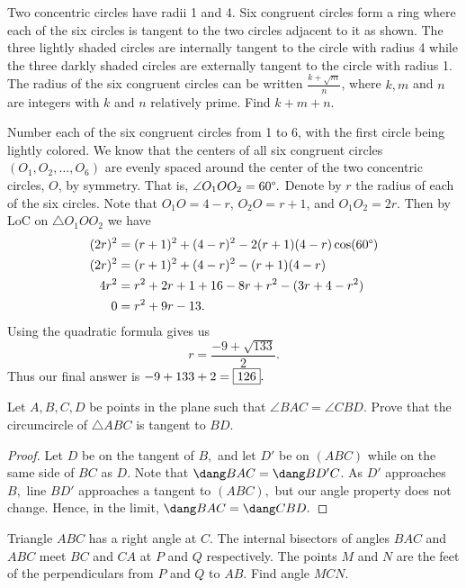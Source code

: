 \documentclass[letterpaper,oneside]{scrartcl}
\begin{document}
\begin{problem*}
  Two concentric circles have radii 1 and 4. Six congruent circles form a ring where each of the six circles is tangent to the two circles adjacent to it as shown. The three lightly shaded circles are internally tangent to the circle with radius 4 while the three darkly shaded circles are externally tangent to the circle with radius 1. The radius of the six congruent circles can be written \(\frac{k+\sqrt{m}}{n}\), where \(k,m\) and \(n\) are integers with \(k\) and \(n\) relatively prime. Find \(k+m+n\).
\end{problem*}
\begin{soln}
  Number each of the six congruent circles from 1 to 6, with the first circle being lightly colored. We know that the centers of all six congruent circles \((O_1,O_2,\dots,O_6)\) are evenly spaced around the center of the two concentric circles, \(O\), by symmetry. That is, \(\angle O_1OO_2 = 60\degree.\) Denote by \(r\) the radius of each of the six circles. Note that \(O_1O=4-r\), \(O_2O = r+1\), and \(O_1O_2 = 2r\). Then by LoC on \(\triangle O_1OO_2\) we have
  \begin{align*}
    (2r)^2 & = (r+1)^2+(4-r)^2-2(r+1)(4-r)\cos(60\degree) \\
    (2r)^2 & = (r+1)^2+(4-r)^2-(r+1)(4-r)                 \\
    4r^2   & = r^2+2r+1+16-8r+r^2-(3r+4-r^2)              \\
    0      & = r^2 +9r-13.
  \end{align*}
  Using the quadratic formula gives us
  \[r=\frac{-9+\sqrt{133}}{2}.\]
  Thus our final answer is \(-9+133+2 = \fbox{126}.\)
\end{soln}
\begin{problem*}
  Let \(A,B,C,D\) be points in the plane such that \(\angle BAC = \angle CBD.\) Prove that the circumcircle of \(\triangle ABC\) is tangent to \(BD\).
\end{problem*}
\begin{proof}
  Let \(D\) be on the tangent of \(B,\) and let \(D'\) be on \((ABC)\) while on the same side of \(BC\) as \(D\). Note that \(\dang BAC = \dang BD'C\). As \(D'\) approaches \(B,\) line \(BD'\) approaches a tangent to \((ABC),\) but our angle property does not change. Hence, in the limit, \(\dang BAC = \dang CBD.\)
\end{proof}
\begin{problem*}
  Triangle \(ABC\) has a right angle at \(C\). The internal bisectors of angles \(BAC\) and \(ABC\) meet \(BC\) and \(CA\) at \(P\) and \(Q\) respectively. The points \(M\) and \(N\) are the feet of the perpendiculars from \(P\) and \(Q\) to \(AB\). Find angle \(MCN\). 
\end{problem*}
\end{document}
